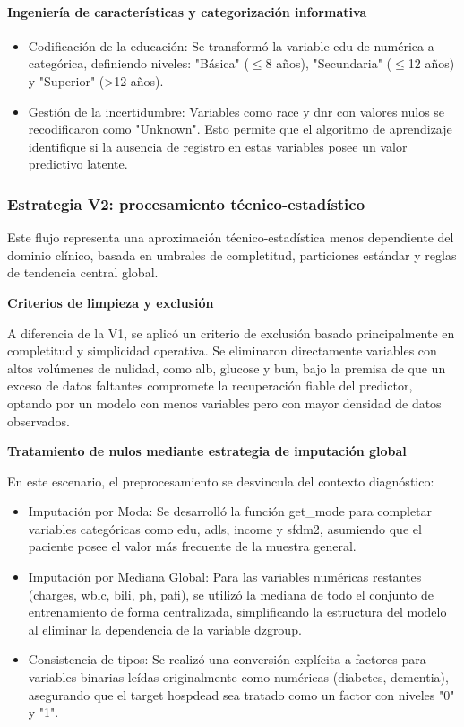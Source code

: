 \paragraph{Ingeniería de características y categorización informativa}

\begin{itemize}
  \item Codificación de la educación: Se transformó la variable edu de numérica a
    categórica, definiendo niveles: "Básica" ($\leq$8 años), "Secundaria" ($\leq$12 años)
    y "Superior" (>12 años).
  \item Gestión de la incertidumbre: Variables como race y dnr con valores nulos se
    recodificaron como "Unknown". Esto permite que el algoritmo de aprendizaje
    identifique si la ausencia de registro en estas variables posee un valor
    predictivo latente.
\end{itemize}

\subsubsection{Estrategia V2: procesamiento técnico-estadístico}

Este flujo representa una aproximación técnico-estadística menos dependiente del
dominio clínico, basada en umbrales de completitud, particiones estándar y
reglas de tendencia central global.

\textbf{Criterios de limpieza y exclusión}

A diferencia de la V1, se aplicó un criterio de exclusión basado principalmente
en completitud y simplicidad operativa. Se eliminaron directamente variables con
altos volúmenes de nulidad, como alb, glucose y bun, bajo la premisa de que un
exceso de datos faltantes compromete la recuperación fiable del predictor,
optando por un modelo con menos variables pero con mayor densidad de datos
observados.

\textbf{Tratamiento de nulos mediante estrategia de imputación global}

En este escenario, el preprocesamiento se desvincula del contexto diagnóstico:

\begin{itemize}
  \item Imputación por Moda: Se desarrolló la función get\_mode para completar
    variables categóricas como edu, adls, income y sfdm2, asumiendo que el
    paciente posee el valor más frecuente de la muestra general.
  \item Imputación por Mediana Global: Para las variables numéricas restantes
    (charges, wblc, bili, ph, pafi), se utilizó la mediana de todo el conjunto
    de entrenamiento de forma centralizada, simplificando la estructura del
    modelo al eliminar la dependencia de la variable dzgroup.
  \item Consistencia de tipos: Se realizó una conversión explícita a factores para
    variables binarias leídas originalmente como numéricas (diabetes, dementia),
    asegurando que el target hospdead sea tratado como un factor con niveles "0"
    y "1".
\end{itemize}

